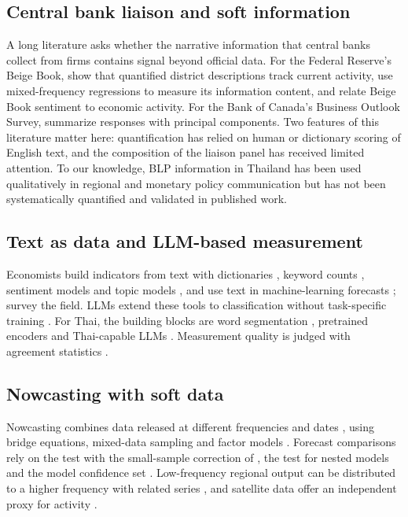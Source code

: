 \documentclass[11pt]{article}
\begin{document}
\subsection{Central bank liaison and soft information}
A long literature asks whether the narrative information that central banks collect from firms contains signal beyond official data. For the Federal Reserve's Beige Book, \citet{balke2002beige} show that quantified district descriptions track current activity, \citet{armesto2009beige} use mixed-frequency regressions to measure its information content, and \citet{sadique2013soft} relate Beige Book sentiment to economic activity. For the Bank of Canada's Business Outlook Survey, \citet{pichette2011bos} summarize responses with principal components. Two features of this literature matter here: quantification has relied on human or dictionary scoring of English text, and the composition of the liaison panel has received limited attention. To our knowledge, BLP information in Thailand has been used qualitatively in regional and monetary policy communication but has not been systematically quantified and validated in published work.

\subsection{Text as data and LLM-based measurement}
Economists build indicators from text with dictionaries \citep{loughran2011liability}, keyword counts \citep{baker2016epu}, sentiment models \citep{shapiro2022news} and topic models \citep{thorsrud2020words}, and use text in machine-learning forecasts \citep{kalamara2022text}; \citet{gentzkow2019text} survey the field. LLMs extend these tools to classification without task-specific training \citep{hansen2023fedspeak}. For Thai, the building blocks are word segmentation \citep{phatthiyaphaibun2023pythainlp}, pretrained encoders \citep{lowphansirikul2021wangchanberta} and Thai-capable LLMs \citep{pipatanakul2023typhoon}. Measurement quality is judged with agreement statistics \citep{cohen1960coefficient,landis1977measurement,krippendorff2018content}.

\subsection{Nowcasting with soft data}
Nowcasting combines data released at different frequencies and dates \citep{giannone2008nowcasting,banbura2013nowcasting}, using bridge equations, mixed-data sampling \citep{ghysels2007midas} and factor models \citep{stock2002diffusion}. Forecast comparisons rely on the \citet{diebold1995comparing} test with the small-sample correction of \citet{harvey1997testing}, the \citet{clark2007approximately} test for nested models and the model confidence set \citep{hansen2011mcs}. Low-frequency regional output can be distributed to a higher frequency with related series \citep{chow1971best}, and satellite data offer an independent proxy for activity \citep{henderson2012lights}.
\end{document}
